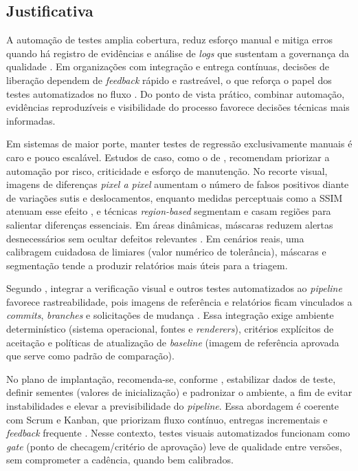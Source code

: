 \documentclass{UNESC}
\begin{document}
\subsection{Justificativa}
{
A automação de testes amplia cobertura, reduz esforço manual e mitiga erros quando há registro de evidências e análise de \emph{logs} que sustentam a governança da qualidade \cite{alberto2020,banerjee2013}. Em organizações com integração e entrega contínuas, decisões de liberação dependem de \emph{feedback} rápido e rastreável, o que reforça o papel dos testes automatizados no fluxo \cite{shahin2017}. Do ponto de vista prático, combinar automação, evidências reproduzíveis e visibilidade do processo favorece decisões técnicas mais informadas.

Em sistemas de maior porte, manter testes de regressão exclusivamente manuais é caro e pouco escalável. Estudos de caso, como o de , recomendam priorizar a automação por risco, criticidade e esforço de manutenção. No recorte visual, imagens de diferenças \emph{pixel a pixel} aumentam o número de falsos positivos diante de variações sutis e deslocamentos, enquanto medidas perceptuais como a SSIM atenuam esse efeito \cite{wang2004,ding2022}, e técnicas \emph{region-based} segmentam e casam regiões para salientar diferenças essenciais. Em áreas dinâmicas, máscaras reduzem alertas desnecessários sem ocultar defeitos relevantes \cite{tanno2020}. Em cenários reais, uma calibragem cuidadosa de limiares (valor numérico de tolerância), máscaras e segmentação tende a produzir relatórios mais úteis para a triagem.

Segundo , integrar a verificação visual e outros testes automatizados ao \emph{pipeline} favorece rastreabilidade, pois imagens de referência e relatórios ficam vinculados a \emph{commits}, \emph{branches} e solicitações de mudança \cite{maia2024}. Essa integração exige ambiente determinístico (sistema operacional, fontes e \emph{renderers}), critérios explícitos de aceitação e políticas de atualização de \emph{baseline} (imagem de referência aprovada que serve como padrão de comparação). 

No plano de implantação, recomenda-se, conforme , estabilizar dados de teste, definir sementes (valores de inicialização) e padronizar o ambiente, a fim de evitar instabilidades e elevar a previsibilidade do \emph{pipeline}. Essa abordagem é coerente com Scrum e Kanban, que priorizam fluxo contínuo, entregas incrementais e \emph{feedback} frequente \cite{bessa2018}. Nesse contexto, testes visuais automatizados funcionam como \emph{gate} (ponto de checagem/critério de aprovação) leve de qualidade entre versões, sem comprometer a cadência, quando bem calibrados.

}
\end{document}
